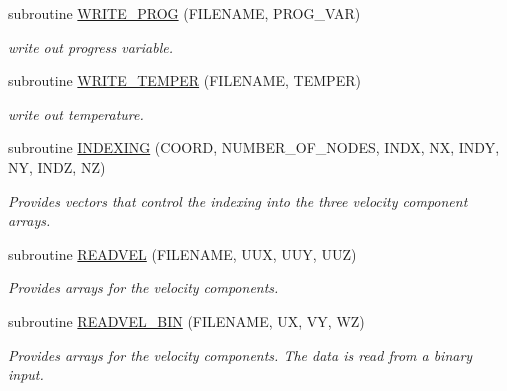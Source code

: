 \begin{DoxyCompactItemize}
subroutine \hyperlink{IO_8f90_aedc8ea8b516e912fcbc924a085c1b4e8}{WRITE\_\-PROG} (FILENAME, PROG\_\-VAR)
\begin{DoxyCompactList}\small\item\em write out progress variable. \end{DoxyCompactList}\item 
subroutine \hyperlink{IO_8f90_ab65e4f53698a6c806ec3a68d759c1768}{WRITE\_\-TEMPER} (FILENAME, TEMPER)
\begin{DoxyCompactList}\small\item\em write out temperature. \end{DoxyCompactList}\item 
subroutine \hyperlink{IO_8f90_a5d81c3b95f841c54113f38818d021b03}{INDEXING} (COORD, NUMBER\_\-OF\_\-NODES, INDX, NX, INDY, NY, INDZ, NZ)
\begin{DoxyCompactList}\small\item\em Provides vectors that control the indexing into the three velocity component arrays. \end{DoxyCompactList}\item 
subroutine \hyperlink{IO_8f90_a824c1f7304ce08200aca3e2bedb17a55}{READVEL} (FILENAME, UUX, UUY, UUZ)
\begin{DoxyCompactList}\small\item\em Provides arrays for the velocity components. \end{DoxyCompactList}\item 
subroutine \hyperlink{IO_8f90_a32a0f0ef4a4fd12825e50389838f8772}{READVEL\_\-BIN} (FILENAME, UX, VY, WZ)
\begin{DoxyCompactList}\small\item\em Provides arrays for the velocity components. The data is read from a binary input. \end{DoxyCompactList}\end{DoxyCompactItemize}


